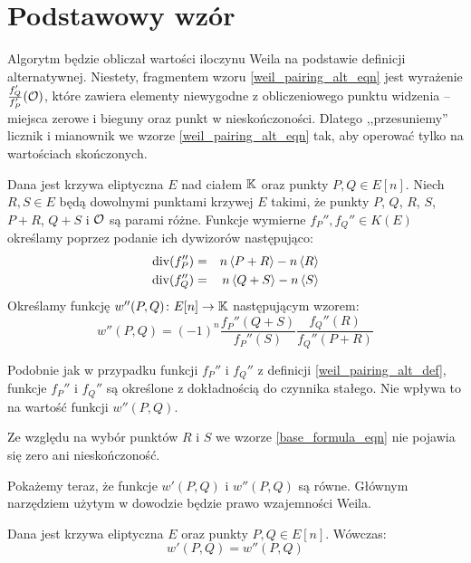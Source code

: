 \section{Podstawowy wzór}

Algorytm będzie obliczał wartości iloczynu Weila
na podstawie definicji alternatywnej.
Niestety, fragmentem wzoru \ref{weil_pairing_alt_eqn}
jest wyrażenie $\frac{f_Q'}{f_P'}(\mathcal{O})$,
które zawiera elementy niewygodne z obliczeniowego punktu widzenia --
miejsca zerowe i bieguny oraz punkt w nieskończoności.
Dlatego ,,przesuniemy'' licznik i mianownik
we wzorze \ref{weil_pairing_alt_eqn} tak,
aby operować tylko na wartościach skończonych.

\begin{definition}\label{base_formula_def}
Dana jest krzywa eliptyczna $E$ nad ciałem $\mathbb{K}$
oraz punkty $P, Q \in E[n]$.
Niech $R, S \in E$ będą dowolnymi punktami krzywej $E$ takimi,
że punkty $P$, $Q$, $R$, $S$, $P+R$, $Q+S$ i $\mathcal{O}$ są parami różne.
Funkcje wymierne $f_P'', f_Q'' \in K(E)$
określamy poprzez podanie ich dywizorów
następująco:
\begin{eqnarray*}
\operatorname{div}(f_P'') & = & n\left\langle P+R\right\rangle - n\left\langle R\right\rangle \\
\operatorname{div}(f_Q'') & = & n\left\langle Q+S\right\rangle - n\left\langle S\right\rangle
\end{eqnarray*}
Określamy funkcję $w''(P, Q)\colon E[n] \to \mathbb{K}$
następującym wzorem:
\begin{equation}\label{base_formula_eqn}
w''(P, Q) = (-1)^n\frac{f_P''(Q+S)}{f_P''(S)}\frac{f_Q''(R)}{f_Q''(P+R)}
\end{equation}
\end{definition}

\begin{remark}
Podobnie jak w przypadku funkcji
$f_P''$ i $f_Q''$ z definicji \ref{weil_pairing_alt_def},
funkcje $f_P''$ i $f_Q''$
są określone z dokładnością do czynnika stałego.
Nie wpływa to na wartość funkcji $w''(P, Q)$.
\end{remark}

\begin{remark}
Ze względu na wybór punktów $R$ i $S$
we wzorze \ref{base_formula_eqn} nie pojawia się zero ani nieskończoność.
\end{remark}

Pokażemy teraz, że funkcje $w'(P, Q)$ i $w''(P, Q)$ są równe.
Głównym narzędziem użytym w dowodzie będzie prawo wzajemności Weila.

\begin{theorem}
Dana jest krzywa eliptyczna $E$ oraz punkty $P, Q \in E[n]$.
Wówczas:
\begin{equation}
w'(P, Q) = w''(P, Q)
\end{equation}
\end{theorem}

